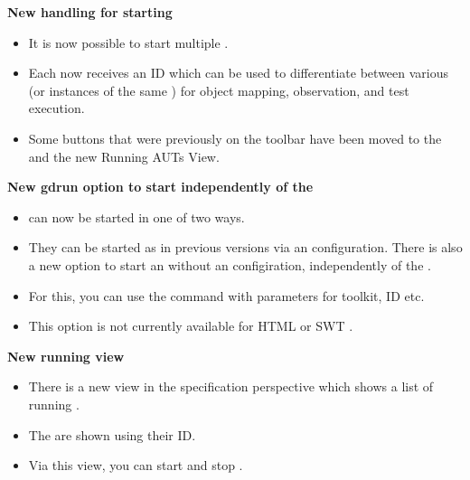\textbf{New handling for starting \gdauts{}}
\begin{itemize}
\item It is now possible to start multiple \gdauts{}. 
\item Each \gdaut{} now receives an ID which can be used to differentiate between various \gdauts{} (or instances of the same \gdaut{}) for object mapping, observation, and test execution. 
\item Some buttons that were previously on the toolbar have been moved to the \gdtestsuitebrowser{} and the new Running AUTs View. 
\end{itemize}

\textbf{New gdrun option to start \gdauts{} independently of the \ite{}}
\begin{itemize}
\item \gdauts{} can now be started in one of two ways. 
\item They can be started as in previous versions via an \gdaut{} configuration. There is also a new option to start an \gdaut{} without an \gdaut{} configiration, independently of the \ite{}. 
\item For this, you can use the command  with parameters for toolkit, \gdaut{} ID etc.
\item This option is not currently available for HTML or SWT \gdauts{}.
\end{itemize}

\textbf{New running \gdauts{} view}
\begin{itemize}
\item There is a new view in the specification perspective which shows a list of running \gdauts{}.
\item The \gdauts{} are shown using their ID.
\item Via this view, you can start \gdsuites{} and stop \gdauts{}.
\end{itemize}

